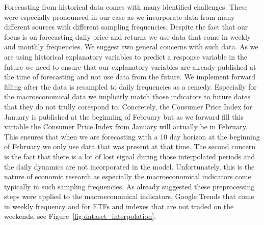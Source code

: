 Forecasting from historical data comes with many identified challenges. These
were especially pronounced in our case as we incorporate data from many
different sources with different sampling frequencies. Despite the fact
that our focus is on forecasting daily price and returns we use data
that come in weekly and monthly frequencies. We suggest two general concerns 
with such data. As we are using historical explanatory variables
to predict a response variable in the future we need to ensure that our
explanatory variables are already published at the time of forecasting and not
use data from the future. We implement forward filling after the data is resampled
to daily frequencies as a remedy. Especially for the macroeconomical data
we implicitly match those indicators to future dates that they do not trully
corespond to. Concretely, the Consumer Price Index for January is published at the 
beginning of February but as we forward fill this variable the Consumer Price Index
from January will actually be in February. This ensures that when we are 
forecasting with a 10 day horizon at the beginning of February we only use
data that was present at that time. The second concern is the fact 
that there is a lot of lost signal during those interpolated periods 
and the daily dynamics are not incorporated in the model. Unfortunately,
this is the nature of economic research as especially the 
macroeconomical indicators come typically in such sampling frequencies.
As already suggested these preprocessing steps were applied to the macroeconomical
indicators, Google Trends that come in weekly frequency and for 
ETFs and indexes that are not traded on the weekends, see Figure~\ref{fig:dataset_interpolation}.

